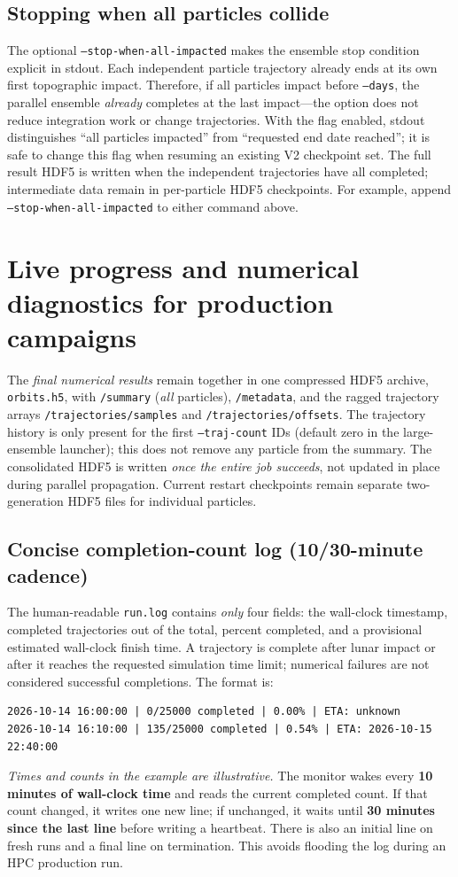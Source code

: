 \documentclass[11pt,a4paper]{article}
\newcommand{\opt}[1]{\texttt{#1}}
\newcommand{\pathcode}[1]{\nolinkurl{#1}}
\begin{document}
\subsection{Stopping when all particles collide}
The optional \opt{--stop-when-all-impacted} makes the ensemble stop condition
explicit in stdout. Each independent particle trajectory already ends
at its own first topographic impact. Therefore, if all particles impact before
\opt{--days}, the parallel ensemble \emph{already} completes at the last
impact---the option does not reduce integration work or change trajectories.
With the flag enabled, stdout distinguishes ``all particles impacted'' from
``requested end date reached''; it is safe to change this flag when resuming
an existing V2 checkpoint set. The full result HDF5 is written when the
independent trajectories have all completed; intermediate data remain in
per-particle HDF5 checkpoints. For example, append
\opt{--stop-when-all-impacted} to either command above.



\section{Live progress and numerical diagnostics for production campaigns}
\label{sec:progress}
The \emph{final numerical results} remain together in one compressed HDF5
archive, \pathcode{orbits.h5}, with \pathcode{/summary} (\emph{all} particles),
\pathcode{/metadata}, and the ragged trajectory arrays
\pathcode{/trajectories/samples} and \pathcode{/trajectories/offsets}.
The trajectory history is only present for the first \opt{--traj-count}
IDs (default zero in the large-ensemble launcher); this does not remove any
particle from the summary. The consolidated HDF5 is written \emph{once the
entire job succeeds}, not updated in place during parallel propagation.
Current restart checkpoints remain separate two-generation HDF5 files for
individual particles.

\subsection{Concise completion-count log (10/30-minute cadence)}
The human-readable \pathcode{run.log} contains \emph{only} four fields: the
wall-clock timestamp, completed trajectories out of the total, percent
completed, and a provisional estimated wall-clock finish time. A trajectory
is complete after lunar impact or after it reaches the requested simulation
time limit; numerical failures are not considered successful completions.
The format is:
\begin{lstlisting}
2026-10-14 16:00:00 | 0/25000 completed | 0.00% | ETA: unknown
2026-10-14 16:10:00 | 135/25000 completed | 0.54% | ETA: 2026-10-15 22:40:00
\end{lstlisting}
\emph{Times and counts in the example are illustrative.} The monitor wakes
every \textbf{10 minutes of wall-clock time} and reads the current completed
count. If that count changed, it writes one new line; if unchanged, it waits
until \textbf{30 minutes since the last line} before writing a heartbeat.
There is also an initial line on fresh runs and a final line on termination.
This avoids flooding the log during an HPC production run.
\end{document}
